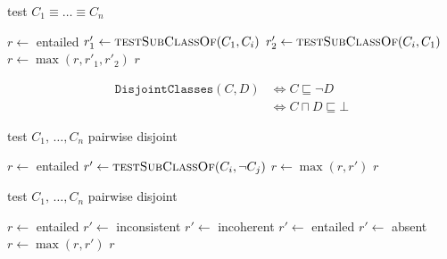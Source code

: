 \documentclass[paper.tex]{subfiles}
\begin{document}
\begin{algorithm}[H]
  \caption{test $C_1 \equiv \ldots \equiv C_n$}
  \begin{algorithmic}[1]
      \State $r \gets$ entailed
        \State $r'_1 \gets \Call{testSubClassOf}{C_1, C_i}$
        \State $r'_2 \gets \Call{testSubClassOf}{C_i, C_1}$
        \State $r \gets \max(r, r'_1, r'_2)$
      \EndFor
      \State \Return $r$
    \EndFunction
  \end{algorithmic}
\end{algorithm}


\begin{align*}
  \mathtt{DisjointClasses}(C, D)
  &\iff C \sqsubseteq \neg D \\
  &\iff C \sqcap D \sqsubseteq \bot
\end{align*}

\begin{algorithm}[H]
  \caption{test $C_1, \,\ldots, C_n$ pairwise disjoint}
  \begin{algorithmic}[1]
      \State $r \gets$ entailed
          \State $r' \gets \Call{testSubClassOf}{C_i, \neg C_j}$
          \State $r \gets \max(r, r')$
        \EndFor
      \EndFor
      \State \Return $r$
    \EndFunction
  \end{algorithmic}
\end{algorithm}

\begin{algorithm}[H]
  \caption{test $C_1, \,\ldots, C_n$ pairwise disjoint}
  \begin{algorithmic}[1]
      \State $r \gets$ entailed
            \State $r' \gets$ inconsistent
          \ElsIf{\todo}
            \State $r' \gets$ incoherent
            \State $r' \gets$ entailed
          \Else
            \State $r' \gets$ absent
          \EndIf
          \State $r \gets \max(r, r')$
        \EndFor
      \EndFor
      \State \Return $r$
    \EndFunction
  \end{algorithmic}
\end{algorithm}
\end{document}
